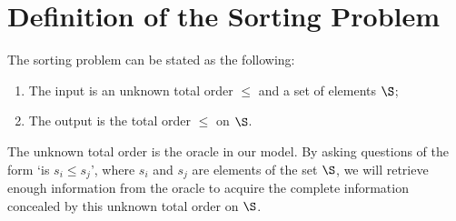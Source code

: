 \section{Definition of the Sorting Problem}
\label{tree:sorting:def}

The sorting problem can be stated as the following:

\begin{enumerate}
\item The input is an unknown total order $\le$ and a set of elements $\S$;
\item The output is the total order $\le$ on $\S$.
\end{enumerate}

The unknown total order is the oracle in our model. By asking questions of the
form `is $s_i \le s_j$', where $s_i$ and $s_j$ are elements of the set $\S$,
we will retrieve enough information from the oracle to acquire the complete
information concealed by this unknown total order on $\S$.


